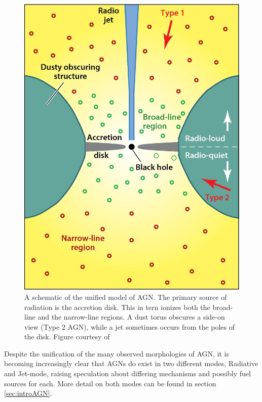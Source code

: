 \begin{figure}
	\centering
	\includegraphics[width=\textwidth]{introduction/unifiedAGN.jpeg}
	\caption[Schematic of unified model of AGN]{A schematic of the unified model of AGN. The primary source of radiation is the accretion disk. This in tern ionizes both the broad-line and the narrow-line regions. A dust torus obscures a side-on view (Type 2 AGN), while a jet sometimes occurs from the poles of the disk. Figure courtesy of \citet{Heckman2014}}
	\label{fig:unifiedAGN}
\end{figure}

Despite the unification of the many observed morphologies of AGN, it is becoming increasingly clear that AGNs do exist in two different modes, Radiative and Jet-mode, raising speculation about differing mechanisms and possibly fuel sources for each. More detail on both modes can be found in section \ref{sec:introAGN}. 

